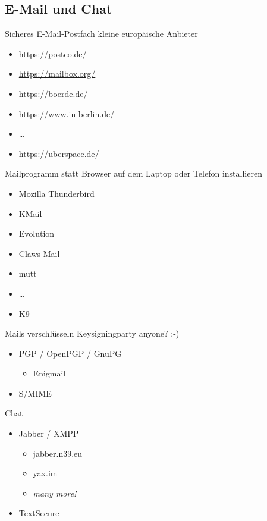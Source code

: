 \documentclass{beamer}
\begin{document}
\subsection{E-Mail und Chat}

\begin{frame}{Sicheres E-Mail-Postfach}
    kleine europäische Anbieter

    \begin{itemize}
        \item \url{https://posteo.de/}
        \item \url{https://mailbox.org/}
        \item \url{https://boerde.de/}
        \item \url{https://www.in-berlin.de/}
        \item …
        \pause
        \item \url{https://uberspace.de/}
    \end{itemize}
\end{frame}

\begin{frame}{Mailprogramm statt Browser}
    auf dem Laptop oder Telefon installieren

    \begin{itemize}
        \item Mozilla Thunderbird
        \item KMail
        \item Evolution
        \item Claws Mail
        \item mutt
        \item …
        \item K9
    \end{itemize}
\end{frame}

\begin{frame}{Mails verschlüsseln}
    Keysigningparty anyone? ;-)

    \begin{itemize}
        \item PGP / OpenPGP / GnuPG
            \begin{itemize}
                \item Enigmail
            \end{itemize}
        \item S/MIME
    \end{itemize}
\end{frame}

\begin{frame}{Chat}
    \begin{itemize}
        \item Jabber / XMPP
            \begin{itemize}
                \item jabber.n39.eu
                \item yax.im
                \item \emph{many more!}
            \end{itemize}
        \item TextSecure
    \end{itemize}
\end{frame}
\end{document}
